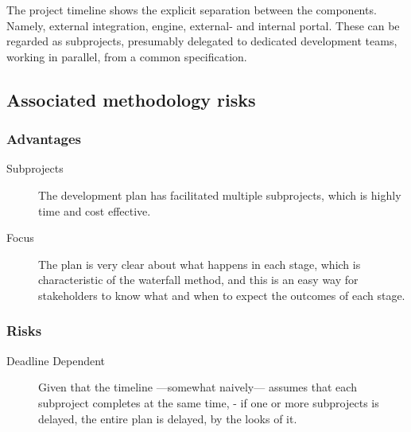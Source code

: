 \documentclass[11pt]{article}
\begin{document}
The project timeline shows the explicit separation between the components. Namely, external integration, engine, external- and internal portal. These can be regarded as subprojects, presumably delegated to dedicated development teams, working in parallel, from a common specification.

\subsection{Associated methodology risks}
\label{sec:B|sub:risks}
\vspace{-0.5em}
\subsubsection{Advantages}
\label{sec:B|sub:risks|sub:advantages}
\begin{description}
    \item[Subprojects] The development plan has facilitated multiple subprojects, which is highly time and cost effective.
    \item[Focus] The plan is very clear about what happens in each stage, which is characteristic of the waterfall method,     and this is an easy way for stakeholders to know what and when to expect the outcomes of each stage.
\end{description}

\subsubsection{Risks}
\vspace{-0.5em}
\label{sec:B|sub:risks|sub:risks}
\begin{description}
    \item[Deadline Dependent] Given that the timeline ---somewhat naively--- assumes that each subproject completes at the same time, - if one or more subprojects is delayed, the entire plan is delayed, by the looks of it.
\end{description}
\end{document}
